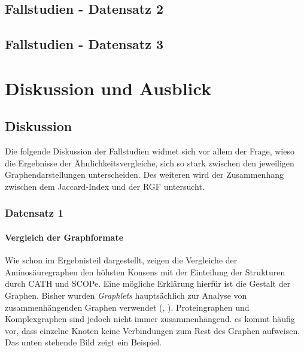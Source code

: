 \documentclass{report}
\begin{document}
\section{Fallstudien - Datensatz 2}

\section{Fallstudien - Datensatz 3}


\chapter{Diskussion und Ausblick}



\section{Diskussion}

Die folgende Diskussion der Fallstudien widmet sich vor allem der Frage, wieso die Ergebnisse der \"Ahnlichkeitsvergleiche, sich so stark zwischen den jeweiligen Graphendarstellungen unterscheiden.
Des weiteren wird der Zusammenhang zwischen dem Jaccard-Index und der RGF untersucht.

\subsection{Datensatz 1}
\subsubsection{Vergleich der Graphformate}

Wie schon im Ergebnisteil dargestellt, zeigen die Vergleiche der Aminos\"auregraphen den h\"ohsten Konsens mit der Einteilung der Strukturen durch CATH und SCOPe. Eine m\"ogliche Erkl\"arung hierf\"ur ist die Gestalt der Graphen. Bisher wurden \textit{Graphlets} haupts\"achlich zur Analyse von zusammenh\"angenden Graphen verwendet (\cite{sherv_graphlets}, \cite{graphletfrequency}).
Proteingraphen und Komplexgraphen sind jedoch nicht immer zusammenh\"angend. es kommt h\"aufig vor, dass einzelne Knoten keine Verbindungen zum Rest des Graphen aufweisen. Das unten stehende Bild zeigt ein Beispiel.
\end{document}

